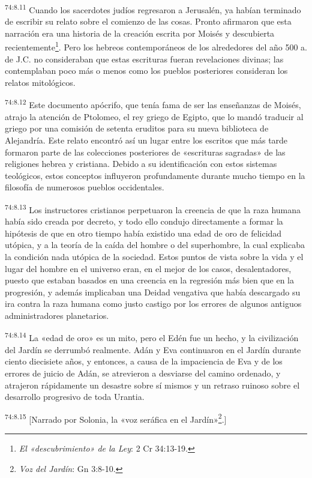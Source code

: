 \par
\textsuperscript{74:8.11} Cuando los sacerdotes judíos regresaron a Jerusalén, ya habían terminado de escribir su relato sobre el comienzo de las cosas. Pronto afirmaron que esta narración era una historia de la creación escrita por Moisés y descubierta recientemente\footnote{\textit{El «descubrimiento» de la Ley}: 2 Cr 34:13-19.}. Pero los hebreos contemporáneos de los alrededores del año 500 a. de J.C. no consideraban que estas escrituras fueran revelaciones divinas; las contemplaban poco más o menos como los pueblos posteriores consideran los relatos mitológicos.

\par
\textsuperscript{74:8.12} Este documento apócrifo, que tenía fama de ser las enseñanzas de Moisés, atrajo la atención de Ptolomeo, el rey griego de Egipto, que lo mandó traducir al griego por una comisión de setenta eruditos para su nueva biblioteca de Alejandría. Este relato encontró así un lugar entre los escritos que más tarde formaron parte de las colecciones posteriores de «escrituras sagradas» de las religiones hebrea y cristiana. Debido a su identificación con estos sistemas teológicos, estos conceptos influyeron profundamente durante mucho tiempo en la filosofía de numerosos pueblos occidentales.

\par
\textsuperscript{74:8.13} Los instructores cristianos perpetuaron la creencia de que la raza humana había sido creada por decreto, y todo ello condujo directamente a formar la hipótesis de que en otro tiempo había existido una edad de oro de felicidad utópica, y a la teoría de la caída del hombre o del superhombre, la cual explicaba la condición nada utópica de la sociedad. Estos puntos de vista sobre la vida y el lugar del hombre en el universo eran, en el mejor de los casos, desalentadores, puesto que estaban basados en una creencia en la regresión más bien que en la progresión, y además implicaban una Deidad vengativa que había descargado su ira contra la raza humana como justo castigo por los errores de algunos antiguos administradores planetarios.

\par
\textsuperscript{74:8.14} La «edad de oro» es un mito, pero el Edén fue un hecho, y la civilización del Jardín se derrumbó realmente. Adán y Eva continuaron en el Jardín durante ciento diecisiete años, y entonces, a causa de la impaciencia de Eva y de los errores de juicio de Adán, se atrevieron a desviarse del camino ordenado, y atrajeron rápidamente un desastre sobre sí mismos y un retraso ruinoso sobre el desarrollo progresivo de toda Urantia.

\par
\textsuperscript{74:8.15} [Narrado por Solonia, la «voz seráfica en el Jardín»\footnote{\textit{Voz del Jardín}: Gn 3:8-10.}.]